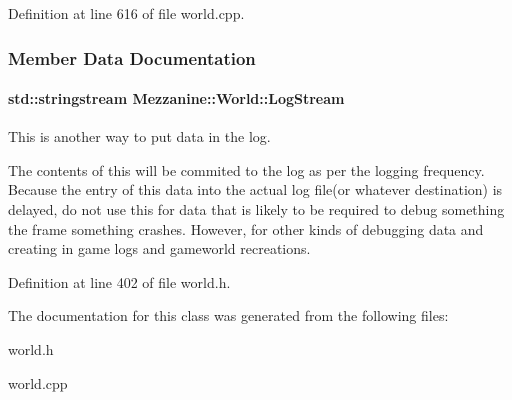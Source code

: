Definition at line 616 of file world.cpp.



\subsubsection{Member Data Documentation}
\hypertarget{classMezzanine_1_1World_a32b1c4de1bbf5495452e463802ffa499}{
\paragraph[{LogStream}]{\setlength{\rightskip}{0pt plus 5cm}std::stringstream {\bf Mezzanine::World::LogStream}}\hfill}
\label{classMezzanine_1_1World_a32b1c4de1bbf5495452e463802ffa499}


This is another way to put data in the log. 

The contents of this will be commited to the log as per the logging frequency. Because the entry of this data into the actual log file(or whatever destination) is delayed, do not use this for data that is likely to be required to debug something the frame something crashes. However, for other kinds of debugging data and creating in game logs and gameworld recreations. 

Definition at line 402 of file world.h.



The documentation for this class was generated from the following files:\begin{DoxyCompactItemize}
\item 
world.h\item 
world.cpp\end{DoxyCompactItemize}
